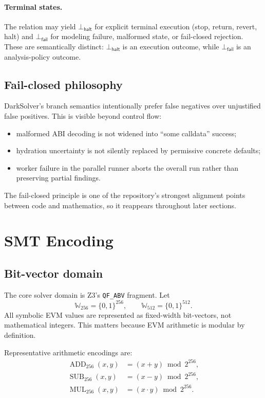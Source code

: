 \documentclass[11pt]{article}
\numberwithin{equation}{section}
\theoremstyle{remark}
\newcommand{\QFABV}{\texttt{QF\_ABV}}
\newcommand{\Bits}[1]{\{0,1\}^{#1}}
\newcommand{\Words}[1]{\mathbb{W}_{#1}}
\newcommand{\Fail}{\bot_{\mathsf{fail}}}
\newcommand{\Halt}{\bot_{\mathsf{halt}}}
\begin{document}
\paragraph{Terminal states.}
The relation may yield \(\Halt\) for explicit terminal execution (stop, return, revert, halt) and \(\Fail\) for modeling failure, malformed state, or fail-closed rejection. These are semantically distinct: \(\Halt\) is an execution outcome, while \(\Fail\) is an analysis-policy outcome.

\subsection{Fail-closed philosophy}

DarkSolver's branch semantics intentionally prefer false negatives over unjustified false positives. This is visible beyond control flow:
\begin{itemize}[leftmargin=1.5em]
  \item malformed ABI decoding is not widened into ``some calldata'' success;
  \item hydration uncertainty is not silently replaced by permissive concrete defaults;
  \item worker failure in the parallel runner aborts the overall run rather than preserving partial findings.
\end{itemize}

The fail-closed principle is one of the repository's strongest alignment points between code and mathematics, so it reappears throughout later sections.

\section{SMT Encoding}
\label{sec:smt-encoding}

\subsection{Bit-vector domain}

The core solver domain is Z3's \QFABV{} fragment. Let
\[
\Words{256} = \Bits{256},
\qquad
\Words{512} = \Bits{512}.
\]
All symbolic EVM values are represented as fixed-width bit-vectors, not mathematical integers. This matters because EVM arithmetic is modular by definition.

Representative arithmetic encodings are:
\begin{align}
\operatorname{ADD}_{256}(x,y) &= (x + y) \bmod 2^{256}, \label{eq:add256} \\
\operatorname{SUB}_{256}(x,y) &= (x - y) \bmod 2^{256}, \label{eq:sub256} \\
\operatorname{MUL}_{256}(x,y) &= (x \cdot y) \bmod 2^{256}. \label{eq:mul256}
\end{align}
\end{document}
